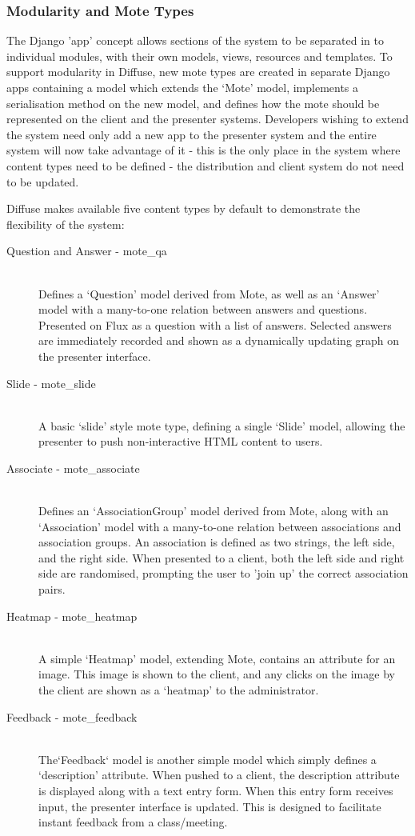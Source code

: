 \documentclass[a4papert,11pt,notitlepage]{ltxdoc}
\begin{document}
\subsubsection{Modularity and Mote Types}
The Django 'app' concept allows sections of the system to be separated in to individual modules, with their own models, views, resources and templates. To support modularity in Diffuse, new mote types are created in separate Django apps containing a model which extends the `Mote' model, implements a serialisation method on the new model, and defines how the mote should be represented on the client and the presenter systems. Developers wishing to extend the system need only add a new app to the presenter system and the entire system will now take advantage of it - this is the only place in the system where content types need to be defined - the distribution and client system do not need to be updated. 

Diffuse makes available five content types by default to demonstrate the flexibility of the system:
\begin{description}
\item[Question and Answer - mote\_qa] \hfill \\
Defines a `Question' model derived from Mote, as well as an `Answer' model with a many-to-one relation between answers and questions. Presented on Flux as a question with a list of answers. Selected answers are immediately recorded and shown as a dynamically updating graph on the presenter interface.
\item[Slide - mote\_slide] \hfill \\
A basic `slide' style mote type, defining a single `Slide' model, allowing the presenter to push non-interactive HTML content to users.
\item[Associate - mote\_associate] \hfill \\
Defines an `AssociationGroup' model derived from Mote, along with an `Association' model with a many-to-one relation between associations and association groups. An association is defined as two strings, the left side, and the right side. When presented to a client, both the left side and right side are randomised, prompting the user to 'join up' the correct association pairs.
\item[Heatmap - mote\_heatmap] \hfill \\
A simple `Heatmap' model, extending Mote, contains an attribute for an image. This image is shown to the client, and any clicks on the image by the client are shown as a `heatmap' to the administrator.
\item[Feedback - mote\_feedback] \hfill \\
The`Feedback` model is another simple model which simply defines a `description' attribute. When pushed to a client, the description attribute is displayed along with a text entry form. When this entry form receives input, the presenter interface is updated. This is designed to facilitate instant feedback from a class/meeting.
\end{description}
\end{document}
